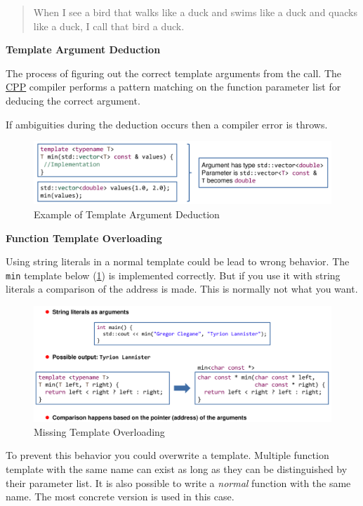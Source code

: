\documentclass[11pt,twoside,landscape]{article}
\begin{document}
\begin{multicols}{3}
\begin{quote}
When I see a bird that walks like a duck and swims like a duck and quacks like a duck, I call that bird a duck.
\end{quote}

\textbf{Template Argument Deduction}

The process of figuring out the correct template arguments from the call.
The \href{../../../roam/20210920103243-c.org}{CPP} compiler performs a pattern matching on the function parameter list for deducing the correct argument.

If ambiguities during the deduction occurs then a compiler error is throws.


\begin{figure}[htbp]
\centering
\includegraphics[width=.9\linewidth]{img/template_argument_deduction.png}
\caption{Example of Template Argument Deduction}
\end{figure}

\textbf{Function Template Overloading}

Using string literals in a normal template could be lead to wrong behavior.
The \texttt{min} template below (\ref{fig:orgf079809}) is implemented correctly.
But if you use it with string literals a comparison of the address is made.
This is normally not what you want.

\begin{figure}[htbp]
\centering
\includegraphics[width=.9\linewidth]{img/missing_template_overloadin.png}
\caption{\label{fig:orgf079809}Missing Template Overloading}
\end{figure}


To prevent this behavior you could overwrite a template.
Multiple function template with the same name can exist as long as they can be distinguished by their parameter list.
It is also possible to write a \emph{normal} function with the same name.
The most concrete version is used in this case.


\end{multicols}
\end{document}
